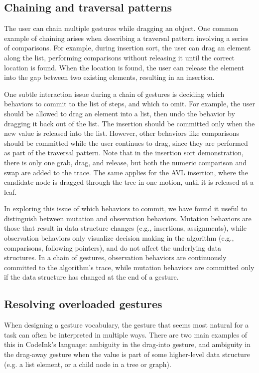 \subsection{Chaining and traversal patterns}
The user can chain multiple gestures while dragging an object. One common
example of chaining arises when describing a traversal pattern involving a
series of comparisons. For example, during insertion sort, the user can drag an
element along the list, performing comparisons without releasing it until the
correct location is found. When the location is found, the user can release the
element into the gap between two existing elements, resulting in an insertion.

One subtle interaction issue during a chain of gestures is deciding which
behaviors to commit to the list of steps, and which to omit. For example, the
user should be allowed to drag an element into a list, then undo the behavior by
dragging it back out of the list. The insertion should be committed only when
the new value is released into the list. However, other behaviors like
comparisons should be committed while the user continues to drag, since they are
performed as part of the traversal pattern. Note that in the insertion sort
demonstration, there is only one grab, drag, and release, but both the
numeric comparison and swap are added to the trace. The same applies for
the AVL insertion, where the candidate node is dragged
through the tree in one motion, until it is released at a leaf.

In exploring this issue of which behaviors to commit, we have found it useful to
distinguish between mutation and observation behaviors. Mutation behaviors are
those that result in data structure changes (e.g., insertions, assignments), while
observation behaviors only visualize decision making in the algorithm
(e.g., comparisons, following pointers), and do not affect the underlying data
structures. In a chain of gestures, observation behaviors are continuously
committed to the algorithm's trace, while mutation behaviors are committed
only if the data structure has changed at the end of a gesture.

\subsection{Resolving overloaded gestures}
\label{sec:overloaded-gestures}

When designing a gesture vocabulary, the gesture that seems most natural for a
task can often be interpreted in multiple ways. There are two main examples of
this in CodeInk's language: ambiguity in the drag-into gesture, and ambiguity in
the drag-away gesture when the value is part of some higher-level data structure
(e.g. a list element, or a child node in a tree or graph).

